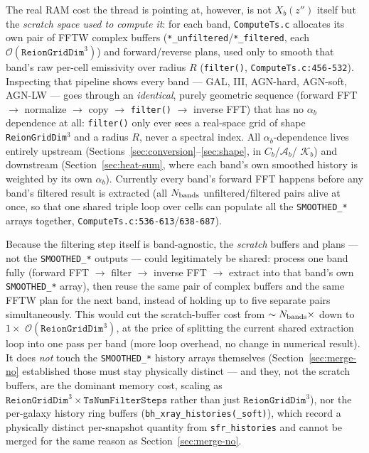 \documentclass[11pt]{article}
\newcommand{\code}[1]{\texttt{#1}}
\begin{document}
The real RAM cost the thread is pointing at, however, is not $X_b(z'')$
itself but the \emph{scratch space used to compute it}: for each band,
\code{ComputeTs.c} allocates its own pair of FFTW complex buffers
(\code{*\_unfiltered}/\code{*\_filtered}, each $\mathcal{O}(\code{ReionGridDim}^3)$)
and forward/reverse plans, used only to smooth that band's raw per-cell
emissivity over radius $R$ (\code{filter()}, \code{ComputeTs.c:456-532}).
Inspecting that pipeline shows every band — GAL, III, AGN-hard, AGN-soft,
AGN-LW — goes through an \emph{identical}, purely geometric sequence
(forward FFT $\to$ normalize $\to$ copy $\to$ \code{filter()} $\to$ inverse
FFT) that has no $\alpha_b$ dependence at all: \code{filter()} only ever
sees a real-space grid of shape \code{ReionGridDim}$^3$ and a radius $R$,
never a spectral index. All $\alpha_b$-dependence lives entirely upstream
(Sections~\ref{sec:conversion}--\ref{sec:shape}, in $C_b$/$\mathcal{A}_b$/
$\mathcal{K}_b$) and downstream (Section~\ref{sec:heat-sum}, where each
band's own smoothed history is weighted by its own $\alpha_b$). Currently
every band's forward FFT happens before any band's filtered result is
extracted (all $N_{\rm bands}$ unfiltered/filtered pairs alive at once, so
that one shared triple loop over cells can populate all the
\code{SMOOTHED\_*} arrays together, \code{ComputeTs.c:536-613}/\code{638-687}).

Because the filtering step itself is band-agnostic, the \emph{scratch}
buffers and plans — not the \code{SMOOTHED\_*} outputs — could legitimately
be shared: process one band fully (forward FFT $\to$ filter $\to$ inverse
FFT $\to$ extract into that band's own \code{SMOOTHED\_*} array), then reuse
the same pair of complex buffers and the same FFTW plan for the next band,
instead of holding up to five separate pairs simultaneously. This would cut
the scratch-buffer cost from $\sim N_{\rm bands}\times$ down to $1\times$
$\mathcal{O}(\code{ReionGridDim}^3)$, at the price of splitting the current
shared extraction loop into one pass per band (more loop overhead, no
change in numerical result). It does \emph{not} touch the
\code{SMOOTHED\_*} history arrays themselves (Section~\ref{sec:merge-no}
established those must stay physically distinct — and they, not the
scratch buffers, are the dominant memory cost, scaling as
$\code{ReionGridDim}^3\times\code{TsNumFilterSteps}$ rather than just
$\code{ReionGridDim}^3$), nor the per-galaxy history ring buffers
(\code{bh\_xray\_histories(\_soft)}), which record a physically distinct
per-snapshot quantity from \code{sfr\_histories} and cannot be merged for
the same reason as Section~\ref{sec:merge-no}.
\end{document}
